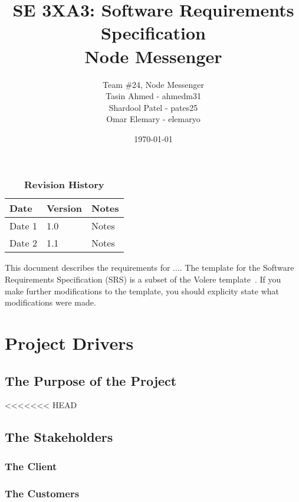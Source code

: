 \documentclass[12pt, titlepage]{article}
\title{SE 3XA3: Software Requirements Specification\\Node Messenger}
\author{Team \#24, Node Messenger
		\\ Tasin Ahmed - ahmedm31
		\\ Shardool Patel - pates25
		\\ Omar Elemary - elemaryo
}
\date{\today}
\begin{document}
    \maketitle

    \tableofcontents
    \listoftables
    \listoffigures

    \begin{table}[bp]
    \caption{\bf Revision History}
    \begin{tabularx}{\textwidth}{p{3cm}p{2cm}X}
    \toprule {\bf Date} & {\bf Version} & {\bf Notes}\\
    \midrule
    Date 1 & 1.0 & Notes\\
    Date 2 & 1.1 & Notes\\
    \bottomrule
    \end{tabularx}
    \end{table}

    \newpage


    This document describes the requirements for ....  The template for the Software
    Requirements Specification (SRS) is a subset of the Volere
    template~\citep{RobertsonAndRobertson2012}.  If you make further modifications
    to the template, you should explicity state what modifications were made.

    \section{Project Drivers}

    	\subsection{The Purpose of the Project}
<<<<<<< HEAD

    	\subsection{The Stakeholders}

    		\subsubsection{The Client}

    		\subsubsection{The Customers}
\end{document}
